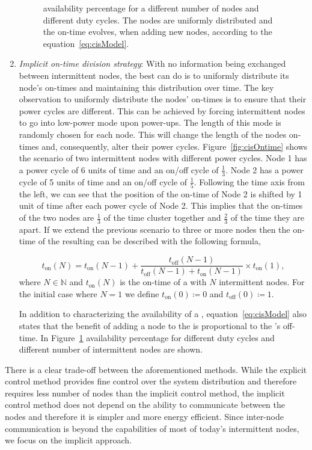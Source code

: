\begin{enumerate}[label=\roman*.]
\begin{figure}
		\caption{\fullsys availability percentage for a different number of nodes and different duty cycles. The nodes are uniformly distributed and the \sys on-time evolves, when adding new nodes, according to the equation~\ref{eq:cisModel}.}
		\label{fig:cisModel}
\end{figure} 
%
		\item \textit{Implicit on-time division strategy}: With no information being exchanged between intermittent nodes, the best \sys can do is to uniformly distribute its node's on-times and maintaining this distribution over time. The key observation to uniformly distribute the nodes' on-times is to ensure that their power cycles are different. This can be achieved by forcing intermittent nodes to go into low-power mode upon power-ups. The length of this mode is randomly chosen for each node. This will change the length of the nodes on-times and, consequently, alter their power cycles. Figure~\ref{fig:cisOntime} shows the scenario of two intermittent nodes with different power cycles. Node 1 has a power cycle of 6 units of time and an on/off cycle of $\frac{1}{3}$. Node 2 has a power cycle of 5 units of time and an on/off cycle of $\frac{1}{5}$. Following the time axis from the left, we can see that the position of the on-time of Node 2 is shifted by 1 unit of time after each power cycle of Node 2. This implies that the on-times of the two nodes are $\frac{1}{3}$ of the time cluster together and $\frac{2}{3}$ of the time they are apart. If we extend the previous scenario to three or more nodes then the on-time of the resulting \sys can be described with the following formula,
				
\begin{equation}
	t_\text{on}(N) = t_\text{on}(N-1) + \frac{t_\text{off}(N-1)}{t_\text{off}(N-1)+t_\text{on}(N-1)} \times t_\text{on}(1),
		\label{eq:cisModel}
\end{equation}
where $N \in \mathbb{N}$ and  $t_\text{on}(N)$ is the on-time of a \sys with $N$ intermittent nodes. For the initial case where $N=1$ we define $t_\text{on}(0)\coloneqq 0$ and $t_\text{off}(0) \coloneqq 1$.
				
In addition to characterizing the availability of a \sys, equation~\ref{eq:cisModel} also states that the benefit of adding a node to the \sys is proportional to the \sys's off-time. In Figure~\ref{fig:cisModel} \sys availability percentage for different duty cycles and different number of intermittent nodes are shown.
\end{enumerate}
 There is a clear trade-off between the aforementioned methods. While the explicit control method provides fine control over the system 
distribution and therefore requires less number of nodes than the implicit control method, the implicit control method does not depend on the ability to communicate between the nodes and therefore it is simpler and more energy efficient. Since inter-node communication is beyond the capabilities of most of today's intermittent nodes, we focus on the implicit approach.
 
